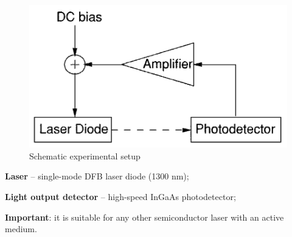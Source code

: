 \begin{minipage}{0.4\textwidth}
\begin{figure}[h]
    \centering
    \hspace{-10 mm}
    \includegraphics[width=1.2\textwidth]{images/SS.png}
    \caption{Schematic experimental setup}
\end{figure}
\end{minipage}
\hfill
\begin{minipage}{0.55\textwidth}

\textbf{Laser} -- single-mode DFB laser diode (1300 nm);

\textbf{Light output detector} -- high-speed InGaAs photodetector;

\end{minipage}


\textbf{Important}: it is suitable for any other semiconductor laser with an active medium.